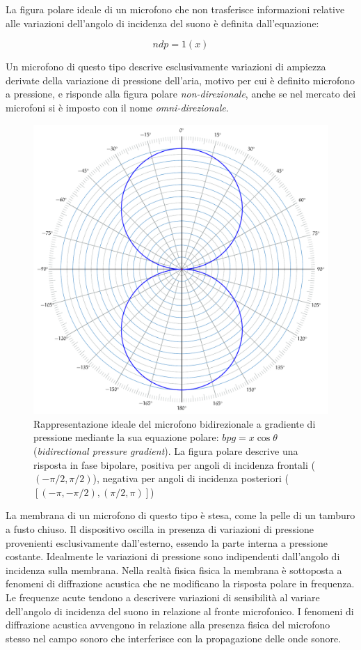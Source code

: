 La figura polare ideale di un microfono che non trasferisce informazioni relative
alle variazioni dell'angolo di incidenza del suono è definita dall'equazione:

\begin{equation}
ndp = 1(x)
\label{eq:omni}
\end{equation}

Un microfono di questo tipo descrive esclusivamente variazioni di ampiezza
derivate della variazione di pressione dell'aria, motivo per cui è definito
microfono a pressione, e risponde alla figura polare \emph{non-direzionale}, anche se
nel mercato dei microfoni si è imposto con il nome \emph{omni-direzionale}.

\begin{figure}[t]
\centering
\includegraphics[width=1\columnwidth]{CAPITOLI/_TIKZ/POLAR/fig8}
\caption{Rappresentazione ideale del microfono bidirezionale a gradiente di
pressione mediante la sua equazione polare: $bpg = x\cos\theta$
(\emph{bidirectional pressure gradient}). La figura polare descrive una risposta
in fase bipolare, positiva per angoli di incidenza frontali ($(-\pi/2,\pi/2)$),
negativa per angoli di incidenza posteriori ($[(-\pi,-\pi/2),(\pi/2,\pi)]$)}
\label{polar:fig8}
\end{figure}

La membrana di un microfono di questo tipo è stesa, come la pelle di un tamburo a fusto chiuso.
Il dispositivo oscilla in presenza di variazioni di pressione provenienti esclusivamente dall’esterno,
essendo la parte interna a pressione costante. Idealmente le variazioni di pressione sono indipendenti
dall’angolo di incidenza sulla membrana. Nella realtà fisica fisica la membrana
è sottoposta a fenomeni di diffrazione acustica che ne modificano la risposta polare in frequenza.
Le frequenze acute tendono a descrivere variazioni di sensibilità al variare
dell’angolo di incidenza del suono in relazione al fronte microfonico.
I fenomeni di diffrazione acustica avvengono in relazione alla presenza fisica
del microfono stesso nel campo sonoro che interferisce con la propagazione delle onde sonore.

